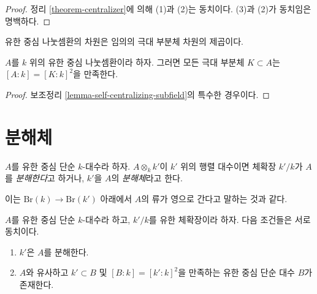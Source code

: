 \begin{proof}
정리 \ref{theorem-centralizer}에 의해 (1)과 (2)는 동치이다.
(3)과 (2)가 동치임은 명백하다.
\end{proof}

\begin{lemma}
\label{lemma-maximal-subfield}
\begin{slogan}
유한 중심 나눗셈환의 차원은 임의의 극대 부분체 차원의 제곱이다.
\end{slogan}
$A$를 $k$ 위의 유한 중심 나눗셈환이라 하자. 그러면 모든 극대 부분체
$K \subset A$는 $[A : k] = [K : k]^2$을 만족한다.
\end{lemma}

\begin{proof}
보조정리 \ref{lemma-self-centralizing-subfield}의 특수한 경우이다.
\end{proof}



\section{분해체}
\label{section-splitting}


\begin{definition}
\label{definition-splitting}
$A$를 유한 중심 단순 $k$-대수라 하자. $A \otimes_k k'$이 $k'$ 위의
행렬 대수이면 체확장 $k'/k$가 $A$를 {\it 분해한다}고 하거나,
$k'$을 $A$의 {\it 분해체}라고 한다.
\end{definition}

\noindent
이는 $\text{Br}(k) \to \text{Br}(k')$ 아래에서 $A$의 류가 영으로
간다고 말하는 것과 같다.

\begin{theorem}
\label{theorem-splitting}
$A$를 유한 중심 단순 $k$-대수라 하고, $k'/k$를 유한 체확장이라 하자.
다음 조건들은 서로 동치이다.
\begin{enumerate}
\item $k'$은 $A$를 분해한다.
\item $A$와 유사하고 $k' \subset B$ 및 $[B : k] = [k' : k]^2$을
만족하는 유한 중심 단순 대수 $B$가 존재한다.
\end{enumerate}
\end{theorem}

